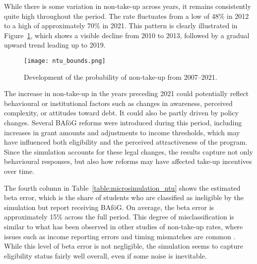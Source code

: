 


While there is some variation in non-take-up across years, it remains consistently quite high throughout the period. 
The rate fluctuates from a low of 48\% in 2012 to a high of approximately 70\% in 2021. 
This pattern is clearly illustrated in Figure~\ref{fig:ntu_bounds_over_years}, which shows a visible decline from 2010 to 2013, followed by a gradual upward trend leading up to 2019. 

\begin{figure}[htbp]
  \centering
  \texttt{[image: ntu\_bounds.png]}
  \caption{Development of the probability of non-take-up from 2007--2021.}
  \label{fig:ntu_bounds_over_years}
\end{figure}

The increase in non-take-up in the years preceding 2021 could potentially reflect behavioural or institutional factors such as changes in awareness, perceived complexity, or attitudes toward debt. 
It could also be partly driven by policy changes. 
Several BAföG reforms were introduced during this period, including increases in grant amounts and adjustments to income thresholds, which may have influenced both eligibility and the perceived attractiveness of the program. 
Since the simulation accounts for these legal changes, the results capture not only behavioural responses, but also how reforms may have affected take-up incentives over time.


The fourth column in Table~\ref{table:microsimulation_ntu} shows the estimated beta error, which is the share of students who are classified as ineligible by the simulation but report receiving BAföG. 
On average, the beta error is approximately 15\% across the full period. 
This degree of misclassification is similar to what has been observed in other studies of non-take-up rates, where issues such as income reporting errors and timing mismatches are common \citep{frick_claim_2007}.
While this level of beta error is not negligible, the simulation seems to capture eligibility status fairly well overall, even if some noise is inevitable.

